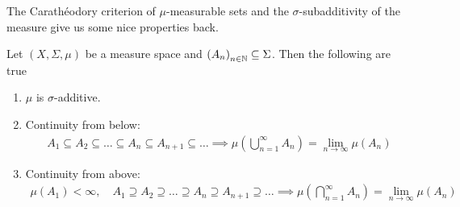 The Carathéodory criterion of $\mu$-measurable sets and the $\sigma$-subadditivity of the measure give us some nice properties back.

\begin{thm}[] \label{thm:mspace-properties}
  Let $(X, \Sigma, \mu)$ be a measure space and $\left(A_{n}\right)_{n \in \mathbb{N}} \subseteq \Sigma$. Then the following are true
  \begin{enumerate}
    \item $\mu$ is $\sigma$-additive.
    \item Continuity from below: 
      \begin{align*}
        A_1 \subseteq A_2 \subseteq \ldots \subseteq A_n \subseteq A_{n+1} \subseteq \ldots \implies 
        \mu \left(\bigcup_{n=1}^{\infty}A_n \right) 
        = \lim_{n \to \infty}\mu(A_n)
      \end{align*}
    \item Continuity from above:
      \begin{align*}
        \mu(A_1) < \infty, \quad
        A_1 \supseteq A_2 \supseteq \ldots \supseteq A_n \supseteq A_{n+1} \supseteq \ldots
        \implies
        \mu\left(
          \bigcap_{n=1}^{\infty}A_n
        \right)
        =
        \lim_{n \to \infty} \mu(A_n)
      \end{align*}

  \end{enumerate}
\end{thm}
